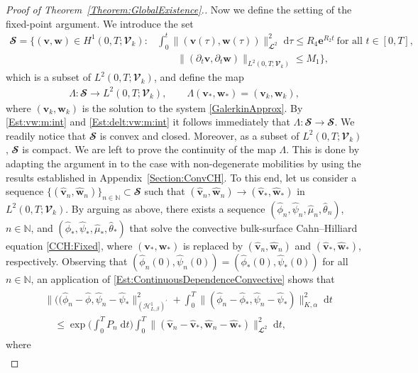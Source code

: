 \documentclass[10pt,reqno]{amsart}
\theoremstyle{remark}
\numberwithin{equation}{section}
\newcommand{\norm}[1]{\| #1 \|}
\newcommand{\N}{\mathbb N}
\newcommand{\bv}{\mathbf{v}}
\newcommand{\bw}{\mathbf{w}}
\newcommand{\ww}{\widehat{\bw}}
\newcommand{\wv}{\widehat{\bv}}
\newcommand{\wphi}{\widehat{\phi}}
\newcommand{\wpsi}{\widehat{\psi}}
\newcommand{\wmu}{\widehat{\mu}}
\newcommand{\wtheta}{\widehat{\theta}}
\newcommand{\dtau}{\;\mathrm d\tau}
\newcommand{\dt}{\;\mathrm dt}
\newcommand{\delt}{\partial_{t}}
\newcommand{\e}{\mathbf{e}}
\begin{document}
\begin{proof}[Proof of Theorem~\ref{Theorem:GlobalExistence}.]
Now we define the setting of the fixed-point argument. We introduce the set
\begin{align*}
    \mathbfcal{S} = \{(\bv,\bw)\in H^1(0,T;\mathbfcal{V}_k): &\int_0^t\norm{(\bv(\tau),\bw(\tau))}_{\mathbfcal{L}^2}^2\dtau \leq R_4\e^{R_2t} \ \text{for all~}t\in[0,T],\\ &\qquad\norm{(\delt\bv,\delt\bw)}_{L^2(0,T;\mathbfcal{V}_k)}\leq M_1\},
\end{align*}
which is a subset of $L^2(0,T;\mathbfcal{V}_k)$, and define the map
\begin{align*}
    \Lambda:\mathbfcal{S}\rightarrow L^2(0,T;\mathbfcal{V}_k), \qquad \Lambda(\bv_\ast,\bw_\ast) = (\bv_k,\bw_k),
\end{align*}
where $(\bv_k,\bw_k)$ is the solution to the system \eqref{GalerkinApprox}. By \eqref{Est:vw:m:int} and \eqref{Est:delt:vw:m:int} it follows immediately that $\Lambda:\mathbfcal{S}\rightarrow\mathbfcal{S}$. We readily notice that $\mathbfcal{S}$ is convex and closed. Moreover, as a subset of $L^2(0,T;\mathbfcal{V}_k)$, $\mathbfcal{S}$ is compact. We are left to prove the continuity of the map $\Lambda$. This is done by adapting the argument in \cite[Theorem~6.1]{Knopf2025a} to the case with non-degenerate mobilities by using the results established in Appendix~\ref{Section:ConvCH}. To this end, let us consider a sequence $\{(\wv_n,\ww_n)\}_{n\in\N}\subset\mathbfcal{S}$ such that $(\wv_n,\ww_n)\rightarrow (\wv_\ast,\ww_\ast)$ in $L^2(0,T;\mathbfcal{V}_k)$. By arguing as above, there exists a sequence $(\wphi_n,\wpsi_n,\wmu_n,\wtheta_n)$, $n\in\N$, and $(\wphi_\ast,\wpsi_\ast,\wmu_\ast,\wtheta_\ast)$ that solve the convective bulk-surface Cahn--Hilliard equation \eqref{CCH:Fixed}, where $(\bv_\ast,\bw_\ast)$ is replaced by $(\wv_n,\ww_n)$ and $(\wv_\ast,\ww_\ast)$, respectively. Observing that $(\wphi_n(0), \wpsi_n(0)) = (\wphi_\ast(0), \wpsi_\ast(0))$ for all $n\in\N$, an application of \eqref{Est:ContinuousDependenceConvective} shows that
\begin{align}\label{ContDep:n}
    \begin{split}
        &\norm{((\wphi_n - \wphi, \wpsi_n - \wpsi_\ast}_{(\mathcal{H}^1_{L,\beta})^\prime}^2 + \int_0^T\norm{(\wphi_n - \wphi_\ast, \wpsi_n - \wpsi_\ast)}_{K,\alpha}^2\dt \\
        &\quad\leq \exp\Big(\int_0^T P_n\dt\Big)\int_0^T\norm{(\wv_n - \wv_\ast, \ww_n - \ww_\ast)}_{\mathbfcal{L}^2}^2\dt,
    \end{split}
\end{align}
where
\begin{align*}

\end{align*}
\end{proof}
\end{document}
